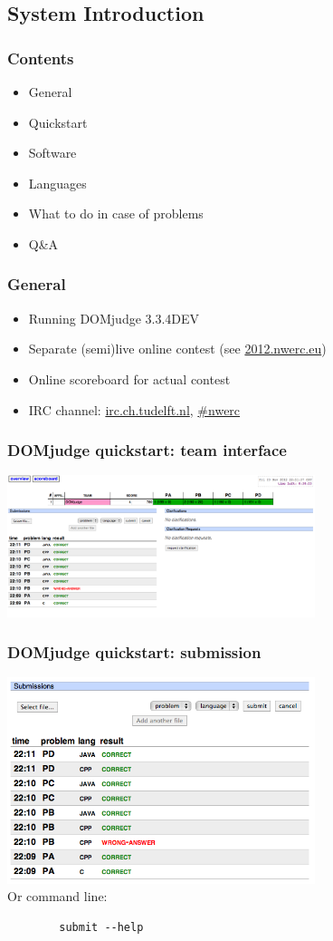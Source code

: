 \documentclass[t]{beamer}
\begin{document}
\subsection{System Introduction}
\begin{frame}
	\frametitle{Contents}
		\begin{itemize}
		\item General
		\item Quickstart
		\item Software
		\item Languages
		\item What to do in case of problems
		\item Q\&A
	\end{itemize}
\end{frame}
\begin{frame}[fragile]
\frametitle{General}
	\begin{itemize}
		\item Running DOMjudge 3.3.4DEV
		\item Separate (semi)live online contest (see \url{2012.nwerc.eu})
		\item Online scoreboard for actual contest
		\item IRC channel: \url{irc.ch.tudelft.nl}, \url{#nwerc}
	\end{itemize}
\end{frame}
\begin{frame}
	\frametitle{DOMjudge quickstart: team interface}
	\includegraphics[width=90mm]{teaminterface.png}
	\end{frame}
\begin{frame}[fragile]
\frametitle{DOMjudge quickstart: submission}
	\includegraphics[width=90mm]{submissions.png}
	\\Or command line:
	\begin{lstlisting}
		submit --help
	\end{lstlisting}
\end{frame}
\end{document}
